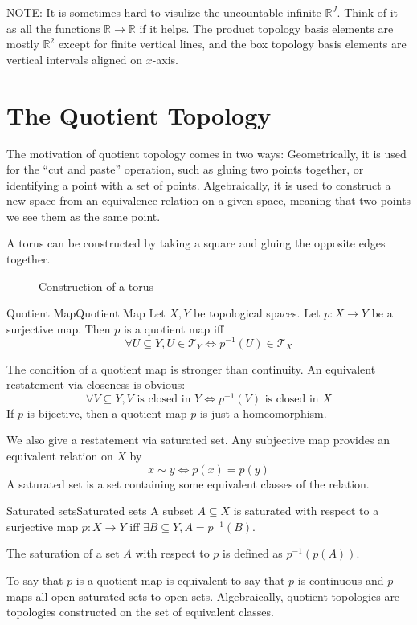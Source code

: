 \documentclass[../main.tex]{subfiles}
\begin{document}
NOTE: It is sometimes hard to visulize the uncountable-infinite $\mathbb{R}^J$. Think of it as all the functions $\mathbb{R} \rightarrow \mathbb{R}$ if it helps. The product topology basis elements are mostly $\mathbb{R}^2$ except for finite vertical lines, and the box topology basis elements are vertical intervals aligned on $x$-axis.


\section{The Quotient Topology}

The motivation of quotient topology comes in two ways: Geometrically, it is used for the ``cut and paste'' operation, such as gluing two points together, or identifying a point with a set of points. Algebraically, it is used to construct a new space from an equivalence relation on a given space, meaning that two points we see them as the same point.

A torus can be constructed by taking a square and gluing the opposite edges together.

\begin{figure}[ht]
    \centering
    \caption{Construction of a torus}
    \label{fig:construction-of-a-torus}
\end{figure}

\begin{definition}{Quotient Map}{Quotient Map}
Let $X,Y$ be topological spaces. Let $p: X \rightarrow Y$ be a surjective map. Then $p$ is a quotient map iff
\begin{equation*}
	\forall U \subseteq Y, U\in \mathcal{T}_Y \Leftrightarrow p^{-1}(U) \in \mathcal{T}_X
\end{equation*}
\end{definition}

The condition of a quotient map is stronger than continuity. An equivalent restatement via closeness is obvious:
\begin{equation*}
	\forall V \subseteq Y, V \text{ is closed in } Y \Leftrightarrow p^{-1}(V) \text{ is closed in } X
\end{equation*}
If $p$ is bijective, then a quotient map $p$ is just a homeomorphism.

We also give a restatement via saturated set. Any subjective map provides an equivalent relation on $X$ by
\begin{equation*}
x\sim y \Leftrightarrow p(x) = p(y)
\end{equation*}
A saturated set is a set containing some equivalent classes of the relation.
\begin{definition}{Saturated sets}{Saturated sets}
A subset $A \subseteq X$ is saturated with respect to a surjective map $p: X \rightarrow Y$ iff $\exists B \subseteq Y,A = p^{-1}(B)$.

The saturation of a set $A$ with respect to $p$ is defined as $p^{-1}(p(A))$.
\end{definition}
To say that $p$ is a quotient map is equivalent to say that $p$ is continuous and $p$ maps all open saturated sets to open sets. Algebraically, quotient topologies are topologies constructed on the set of equivalent classes.
\end{document}

